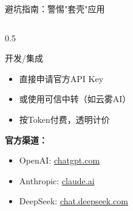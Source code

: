 \documentclass[aspectratio=169,11pt]{beamer}
\begin{document}
\begin{frame}{避坑指南：警惕"套壳"应用}
\begin{columns}
\begin{column}{0.5\textwidth}
            \begin{block}{开发/集成}
                \begin{itemize}
                    \item 直接申请官方API Key
                    \item 或使用可信中转（如云雾AI）
                    \item 按Token付费，透明计价
                \end{itemize}
            \end{block}
            
            \vspace{0.2cm}
            \textbf{官方渠道：}
            \begin{itemize}
                \item OpenAI: \url{chatgpt.com}
                \item Anthropic: \url{claude.ai}
                \item DeepSeek: \url{chat.deepseek.com}
            \end{itemize}
        \end{column}
    \end{columns}
\end{frame}
\end{document}
